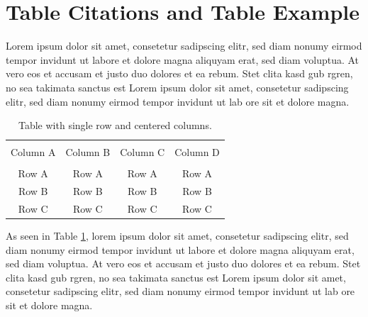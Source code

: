 \section{Table Citations and Table Example}

Lorem ipsum dolor sit amet, consetetur sadipscing elitr, sed diam nonumy eirmod tempor invidunt ut labore et dolore magna aliquyam erat, sed diam voluptua. At vero eos et accusam et justo duo dolores et ea rebum. Stet clita kasd gub rgren, no sea takimata sanctus est Lorem ipsum dolor sit amet, consetetur sadipscing elitr, sed diam nonumy eirmod tempor invidunt ut lab ore sit et dolore magna.

\begin{table}[h]
	{\setlength{\tabcolsep}{14pt}
		\caption{Table with single row and centered columns.}
		\begin{center}
			\vspace{-6mm}
			\begin{tabular}{cccc}
				\hline \\[-2.45ex] \hline \\[-2.1ex]
				Column A & Column B & Column C & Column D \\
				\hline \\[-1.8ex]
				Row A & Row A & Row A & Row A \\
				Row B & Row B & Row B & Row B \\
				Row C & Row C & Row C & Row C \\
				\hline
			\end{tabular}
			\vspace{-6mm}
		\end{center}
		\label{Table2.1}}
\end{table}

As seen in Table \ref{Table2.1}, lorem ipsum dolor sit amet, consetetur sadipscing elitr, sed diam nonumy eirmod tempor invidunt ut labore et dolore magna aliquyam erat, sed diam voluptua. At vero eos et accusam et justo duo dolores et ea rebum. Stet clita kasd gub rgren, no sea takimata sanctus est Lorem ipsum dolor sit amet, consetetur sadipscing elitr, sed diam nonumy eirmod tempor invidunt ut lab ore sit et dolore magna.

